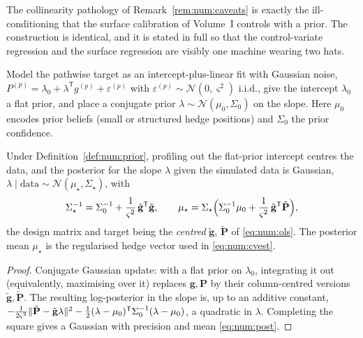 The collinearity pathology of Remark~\ref{rem:num:caveats} is exactly the
ill-conditioning that the surface calibration of Volume~I controls with a prior.
The construction is identical, and it is stated in full so that the
control-variate regression and the surface regression are visibly one machine
wearing two hats.

\begin{definition}\label{def:num:prior}
Model the pathwise target as an intercept-plus-linear fit with Gaussian noise,
$P^{(p)} = \lambda_0 + \lambda^{\mathsf T} g^{(p)} + \varepsilon^{(p)}$ with
$\varepsilon^{(p)} \sim \mathcal{N}(0, \varsigma^2)$ i.i.d., give the intercept
$\lambda_0$ a flat prior, and place a conjugate prior
$\lambda \sim \mathcal{N}(\mu_0, \Sigma_0)$ on the slope. Here $\mu_0$ encodes
prior beliefs (small or structured hedge positions) and $\Sigma_0$ the prior
confidence.
\end{definition}

\begin{proposition}\label{prop:num:posterior}
Under Definition~\ref{def:num:prior}, profiling out the flat-prior intercept
centres the data, and the posterior for the slope $\lambda$ given the simulated
data is Gaussian, $\lambda \mid \text{data} \sim
\mathcal{N}(\mu_\star, \Sigma_\star)$, with
\begin{equation}\label{eq:num:post}
   \Sigma_\star^{-1}
   = \Sigma_0^{-1} + \frac{1}{\varsigma^2}\,\tilde{\mathbf g}^{\mathsf T}\tilde{\mathbf g},
   \qquad
   \mu_\star
   = \Sigma_\star\Bigl(\Sigma_0^{-1}\mu_0
       + \frac{1}{\varsigma^2}\,\tilde{\mathbf g}^{\mathsf T}\tilde{\mathbf P}\Bigr),
\end{equation}
the design matrix and target being the \emph{centred} $\tilde{\mathbf g}$,
$\tilde{\mathbf P}$ of \eqref{eq:num:ols}. The posterior mean $\mu_\star$ is the
regularised hedge vector used in \eqref{eq:num:cvest}.
\end{proposition}

\begin{proof}
Conjugate Gaussian update: with a flat prior on $\lambda_0$, integrating it out
(equivalently, maximising over it) replaces $\mathbf g,\mathbf P$ by their
column-centred versions $\tilde{\mathbf g},\tilde{\mathbf P}$. The resulting
log-posterior in the slope is, up to an additive constant,
$-\tfrac{1}{2\varsigma^2}\lVert\tilde{\mathbf P} - \tilde{\mathbf g}\lambda\rVert^2
 -\tfrac12(\lambda-\mu_0)^{\mathsf T}\Sigma_0^{-1}(\lambda-\mu_0)$,
a quadratic in $\lambda$. Completing the square gives a Gaussian with precision
and mean \eqref{eq:num:post}.
\end{proof}

